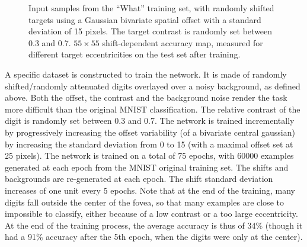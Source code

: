 \begin{figure}[t!]%
	\caption{\A Input samples from the ``What'' training set, with  randomly shifted targets using a Gaussian bivariate spatial offset with a standard deviation of 15 pixels. The target contrast is randomly set between 0.3 and 0.7.
	\B $55 \times 55$ shift-dependent accuracy map, measured for different target eccentricities on the test set after training.  
	}
\label{fig:accuracy}
\end{figure}

A specific dataset is constructed to train the network. It is made of  randomly shifted/randomly attenuated digits overlayed over a noisy background, as defined above. Both the offset, the contrast and the background noise render the task more difficult than the original MNIST classification. The relative contrast of the digit is randomly set between 0.3 and 0.7.  The network is trained incrementally by progressively increasing the offset variability (of a bivariate central gaussian) by increasing the standard deviation from 0 to 15 (with a maximal offset set at 25 pixels). The network is trained on a total of 75 epochs, with 60000 examples generated at each epoch from the MNIST original training set. The shifts and backgrounds are re-generated at each epoch. The shift standard deviation increases of one unit every 5 epochs.  Note that at the end of the training, many digits fall outside the center of the fovea, so that many examples are close to impossible to classify, either because of a low contrast or a too large eccentricity. At the end of the training process, the average accuracy is thus of 34\% (though it had a 91\% accuracy after the 5th epoch, when the digits were only at the center). 

